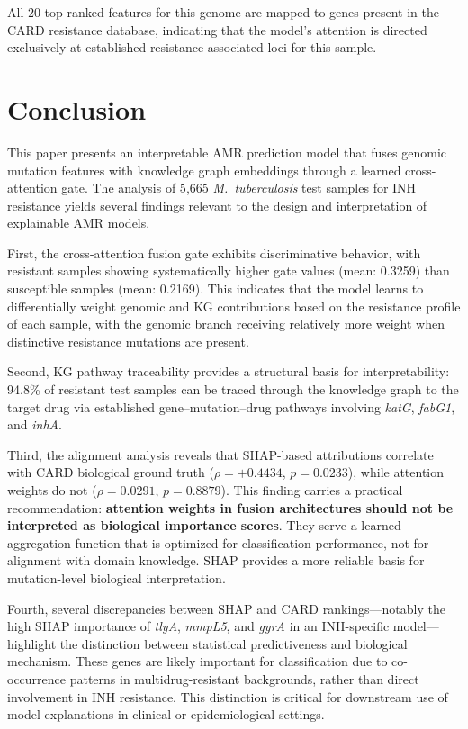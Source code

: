 \documentclass[conference]{IEEEtran}
\begin{document}
All 20 top-ranked features for this genome are mapped to genes present in the CARD resistance database, indicating that the model's attention is directed exclusively at established resistance-associated loci for this sample.

\section{Conclusion}

This paper presents an interpretable AMR prediction model that fuses genomic mutation features with knowledge graph embeddings through a learned cross-attention gate. The analysis of 5{,}665 \textit{M.\ tuberculosis} test samples for INH resistance yields several findings relevant to the design and interpretation of explainable AMR models.

First, the cross-attention fusion gate exhibits discriminative behavior, with resistant samples showing systematically higher gate values (mean: 0.3259) than susceptible samples (mean: 0.2169). This indicates that the model learns to differentially weight genomic and KG contributions based on the resistance profile of each sample, with the genomic branch receiving relatively more weight when distinctive resistance mutations are present.

Second, KG pathway traceability provides a structural basis for interpretability: 94.8\% of resistant test samples can be traced through the knowledge graph to the target drug via established gene--mutation--drug pathways involving \textit{katG}, \textit{fabG1}, and \textit{inhA}.

Third, the alignment analysis reveals that SHAP-based attributions correlate with CARD biological ground truth ($\rho = +0.4434$, $p = 0.0233$), while attention weights do not ($\rho = 0.0291$, $p = 0.8879$). This finding carries a practical recommendation: \textbf{attention weights in fusion architectures should not be interpreted as biological importance scores}. They serve a learned aggregation function that is optimized for classification performance, not for alignment with domain knowledge. SHAP provides a more reliable basis for mutation-level biological interpretation.

Fourth, several discrepancies between SHAP and CARD rankings---notably the high SHAP importance of \textit{tlyA}, \textit{mmpL5}, and \textit{gyrA} in an INH-specific model---highlight the distinction between statistical predictiveness and biological mechanism. These genes are likely important for classification due to co-occurrence patterns in multidrug-resistant backgrounds, rather than direct involvement in INH resistance. This distinction is critical for downstream use of model explanations in clinical or epidemiological settings.
\end{document}
